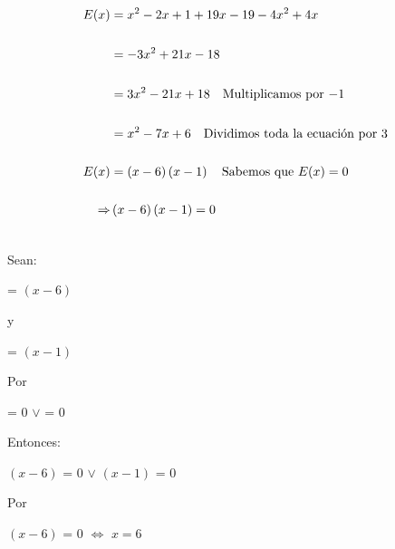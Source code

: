 \documentclass[12pt]{article}
\begin{document}
\begin{equation*}
    \begin{split}
      E(x) & = x^{2} - 2x + 1 +19x-19-4x^{2}+4x\\\\ 
      & = -3x^{2} + 21x - 18 \\\\
      & = 3x^{2} - 21x + 18 \quad \textup{Multiplicamos por $-1$}\\\\ 
      & = x^{2} - 7x + 6 \quad \textup{Dividimos toda la ecuación por $3$}\\\\
E(x) & = \left(x-6\right)\left(x-1\right) \quad \textup{Sabemos que $E(x)= 0$}\\\\
      \Rightarrow & \left(x-6\right)\left(x-1\right) = 0 \\\\
    \end{split}
\end{equation*}

Sean: 
\begin{center}
   {} = $\left(x-6\right)$   
\end{center}

\begin{center}
    y
\end{center}

\begin{center}
   {} = $\left(x-1\right)$   
\end{center}
    
Por {}
\begin{center}
   {} = $0$  $\vee$ {} = $0$   
\end{center}

Entonces:

\begin{center}
   
   $\left(x-6\right)$ = $0$  $\vee$ $\left(x-1\right)$ = $0$   
   
\end{center}

Por {}

\begin{center}
   
   $\left(x-6\right)$  = $0$ $\Leftrightarrow$ $ x=6 $ 
   
\end{center}
\end{document}
